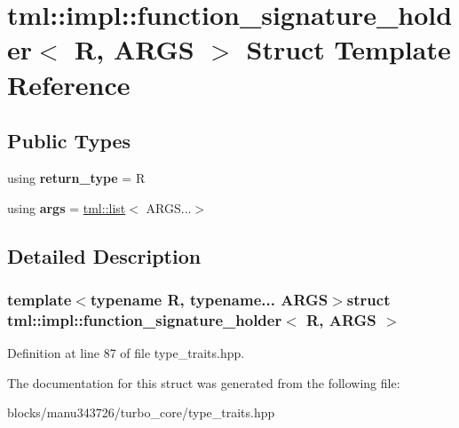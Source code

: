 \hypertarget{structtml_1_1impl_1_1function__signature__holder}{\section{tml\+:\+:impl\+:\+:function\+\_\+signature\+\_\+holder$<$ R, A\+R\+G\+S $>$ Struct Template Reference}
\label{structtml_1_1impl_1_1function__signature__holder}
}
\subsection*{Public Types}
\begin{DoxyCompactItemize}
\item 
\hypertarget{structtml_1_1impl_1_1function__signature__holder_a6fa79dc5b5611b839b29f38e0af5d632}{using {\bfseries return\+\_\+type} = R}\label{structtml_1_1impl_1_1function__signature__holder_a6fa79dc5b5611b839b29f38e0af5d632}

\item 
\hypertarget{structtml_1_1impl_1_1function__signature__holder_a49c77b960122ff55943dfba21ec5ea76}{using {\bfseries args} = \hyperlink{structtml_1_1list}{tml\+::list}$<$ A\+R\+G\+S...$>$}\label{structtml_1_1impl_1_1function__signature__holder_a49c77b960122ff55943dfba21ec5ea76}

\end{DoxyCompactItemize}


\subsection{Detailed Description}
\subsubsection*{template$<$typename R, typename... A\+R\+G\+S$>$struct tml\+::impl\+::function\+\_\+signature\+\_\+holder$<$ R, A\+R\+G\+S $>$}



Definition at line 87 of file type\+\_\+traits.\+hpp.



The documentation for this struct was generated from the following file\+:\begin{DoxyCompactItemize}
\item 
blocks/manu343726/turbo\+\_\+core/type\+\_\+traits.\+hpp\end{DoxyCompactItemize}
